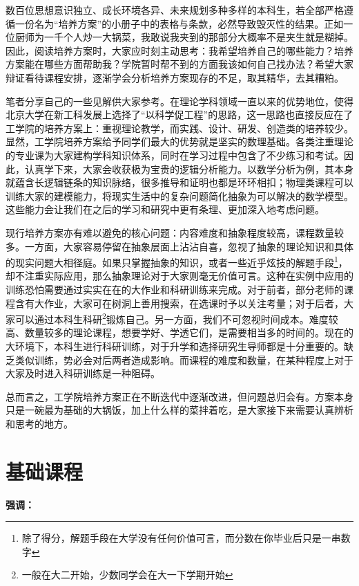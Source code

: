 \documentclass[11pt,oneside]{book}
\begin{document}
\vspace{20pt}

数百位思想意识独立、成长环境各异、未来规划多种多样的本科生，若全部严格遵循一份名为“培养方案”的小册子中的表格与条款，必然导致毁灭性的结果。正如一位厨师为一千个人炒一大锅菜，我敢说我夹到的那部分大概率不是夹生就是糊掉。因此，阅读培养方案时，大家应时刻主动思考：我希望培养自己的哪些能力？培养方案能在哪些方面帮助我？学院暂时帮不到的方面我该如何自己找办法？希望大家辩证看待课程安排，逐渐学会分析培养方案现存的不足，取其精华，去其糟粕。

\vspace{20pt}

笔者分享自己的一些见解供大家参考。在理论学科领域一直以来的优势地位，使得北京大学在新工科发展上选择了“以科学促工程”的思路，这一思路也直接反应在了工学院的培养方案上：重视理论教学，而实践、设计、研发、创造类的培养较少。显然，工学院培养方案给予同学们最大的优势就是坚实的数理基础。各类注重理论的专业课为大家建构学科知识体系，同时在学习过程中包含了不少练习和考试。因此，认真学下来，大家会收获极为宝贵的逻辑分析能力。以数学分析为例，其本身就蕴含长逻辑链条的知识脉络，很多推导和证明也都是环环相扣；物理类课程可以训练大家的建模能力，将现实生活中的复杂问题简化抽象为可以解决的数学模型。这些能力会让我们在之后的学习和研究中更有条理、更加深入地考虑问题。

\vspace{20pt}

现行培养方案亦有难以避免的核心问题：内容难度和抽象程度较高，课程数量较多。一方面，大家容易停留在抽象层面上沾沾自喜，忽视了抽象的理论知识和具体的现实问题大相径庭。如果只掌握抽象的知识，或者一些近乎炫技的解题手段\footnote{除了得分，解题手段在大学没有任何价值可言，而分数在你毕业后只是一串数字}，却不注重实际应用，那么抽象理论对于大家则毫无价值可言。这种在实例中应用的训练恐怕需要通过实实在在的大作业和科研训练来完成。对于前者，部分老师的课程含有大作业，大家可在树洞上善用搜索，在选课时予以关注考量；对于后者，大家可以通过本科生科研\footnote{一般在大二开始，少数同学会在大一下学期开始}锻炼自己。另一方面，我们不可忽视时间成本。难度较高、数量较多的理论课程，想要学好、学透它们，是需要相当多的时间的。现在的大环境下，本科生进行科研训练，对于升学和选择研究生导师都是十分重要的。缺乏类似训练，势必会对后两者造成影响。而课程的难度和数量，在某种程度上对于大家及时进入科研训练是一种阻碍。

总而言之，工学院培养方案正在不断迭代中逐渐改进，但问题总归会有。方案本身只是一碗最为基础的大锅饭，加上什么样的菜拌着吃，是大家接下来需要认真辨析和思考的地方。


\section{基础课程}
\textbf{强调：}
\end{document}

